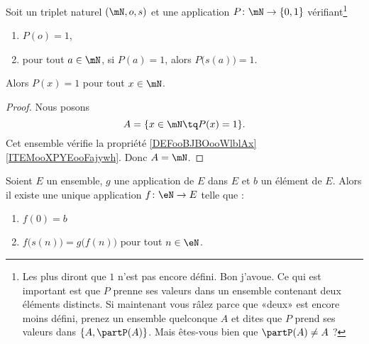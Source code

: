 \begin{proposition}      \label{PROPooXTRCooKwrWkq}
	Soit un triplet naturel \( (\mN,o,s)\) et une application \( P\colon \mN\to \{ 0,1 \}\) vérifiant\footnote{Les plus  diront que \( 1\) n'est pas encore défini. Bon j'avoue. Ce qui est important est que \( P\) prenne ses valeurs dans un ensemble contenant deux éléments distincts. Si maintenant vous râlez parce que «deux» est encore moins défini, prenez un ensemble quelconque \( A\) et dites que \( P\) prend ses valeurs dans \( \{ A, \partP(A)\}\). Mais êtes-vous bien  que \( \partP(A)\neq A\) ?}
	\begin{enumerate}
		\item	\label{ITEMooRecurPropInit}
		      \( P(o) = 1\),
		\item	\label{ITEMooRecurPropHered}
		      pour tout \( a\in \mN\), si \( P(a)=1\), alors \( P\big( s(a) \big)=1\).
	\end{enumerate}
	Alors \( P(x)=1\) pour tout \( x\in \mN\).
\end{proposition}

\begin{proof}
	Nous posons
	\begin{equation}
		A=\{ x\in\mN\tq P(x)=1 \}.
	\end{equation}
	Cet ensemble vérifie la propriété \ref{DEFooBJBOooWlblAx}\ref{ITEMooXPYEooFajywh}. Donc \( A=\mN\).
\end{proof}

\begin{theorem}       \label{THOooEJPYooZFVnez}
	Soient \( E\) un ensemble, \( g\) une application de \( E\) dans \( E\) et \( b\) un élément de \( E\).  Alors il existe une unique application \( f\colon \eN\to E\) telle que :
	\begin{enumerate}
		\item
		      \( f(0)=b\)
		\item
		      \( f\big( s(n) \big)=g\big( f(n) \big)\) pour tout \( n\in \eN \).
	\end{enumerate}
\end{theorem}

